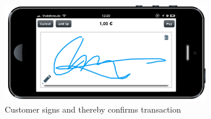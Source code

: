 \documentclass[a4paper, oneside]{csthesis}
\begin{document}
\begin{figure}
        \centering
        \begin{subfigure}[b]{0.5\textwidth}
                \centering
                \includegraphics[width=\textwidth]{figures/flow5.png}
                \caption{Customer signs and thereby confirms transaction}
                \label{fig:flow5}
        \end{subfigure}
        \begin{subfigure}[b]{0.22\textwidth}
                \centering

\end{subfigure}
\end{figure}
\end{document}
